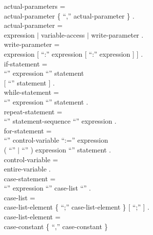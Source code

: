 \begin{grammar}
  {\GA}actual-parameters =                                \\
    {\GB}actual-parameter \{ ``,'' actual-parameter \} .  \\
  {\GA}actual-parameter =                                 \\
    {\GB}expression $|$ variable-access $|$
         write-parameter .                                \\
  {\GA}write-parameter =                                  \\
    {\GB}expression
           [ ``:'' expression [ ``:'' expression ] ] .    \\
  {\GA}if-statement =                                     \\
    {\GB}``{\If}'' expression ``{\Then}'' statement       \\
      {\GC}[ ``{\Else}'' statement ] .                    \\
  {\GA}while-statement =                                  \\
    {\GB}``{\While}'' expression ``{\Do}'' statement .    \\
  {\GA}repeat-statement =                                 \\
    {\GB}``{\Repeat}'' statement-sequence
           ``{\Until}'' expression .                      \\
  {\GA}for-statement =                                    \\
    {\GB}``{\For}'' control-variable ``:='' expression    \\
      {\GC}( ``{\To}'' $|$ ``{\Downto}'' ) expression
             ``{\Do}'' statement .                        \\
  {\GA}control-variable =                                 \\
    {\GB}entire-variable .                                \\
  {\GA}case-statement =                                   \\
    {\GB}``{\Case}'' expression ``{\Of}''
           case-list ``{\End}'' .                         \\
  {\GA}case-list =                                        \\
    {\GB}case-list-element \{ ``;'' case-list-element \}
           [ ``;'' ] .                                    \\
  {\GA}case-list-element =                                \\
    {\GB}case-constant \{ ``,'' case-constant \}

\end{grammar}
